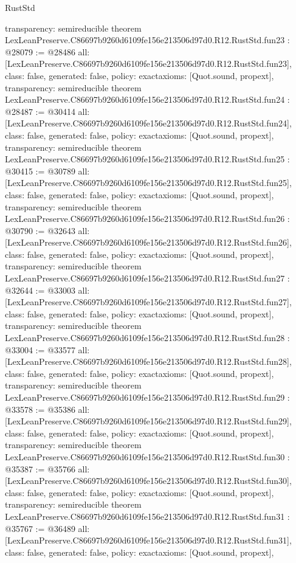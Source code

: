 \begin{lexlean}{RustStd}
\begin{coremodule}
{  transparency: semireducible
}
theorem LexLeanPreserve.C86697b9260d6109fe156e213506d97d0.R12.RustStd.fun23 : @28079 := @28486 {
  all: [LexLeanPreserve.C86697b9260d6109fe156e213506d97d0.R12.RustStd.fun23],
  class: false,
  generated: false,
  policy: exact{axioms: [Quot.sound, propext]},
  transparency: semireducible
}
theorem LexLeanPreserve.C86697b9260d6109fe156e213506d97d0.R12.RustStd.fun24 : @28487 := @30414 {
  all: [LexLeanPreserve.C86697b9260d6109fe156e213506d97d0.R12.RustStd.fun24],
  class: false,
  generated: false,
  policy: exact{axioms: [Quot.sound, propext]},
  transparency: semireducible
}
theorem LexLeanPreserve.C86697b9260d6109fe156e213506d97d0.R12.RustStd.fun25 : @30415 := @30789 {
  all: [LexLeanPreserve.C86697b9260d6109fe156e213506d97d0.R12.RustStd.fun25],
  class: false,
  generated: false,
  policy: exact{axioms: [Quot.sound, propext]},
  transparency: semireducible
}
theorem LexLeanPreserve.C86697b9260d6109fe156e213506d97d0.R12.RustStd.fun26 : @30790 := @32643 {
  all: [LexLeanPreserve.C86697b9260d6109fe156e213506d97d0.R12.RustStd.fun26],
  class: false,
  generated: false,
  policy: exact{axioms: [Quot.sound, propext]},
  transparency: semireducible
}
theorem LexLeanPreserve.C86697b9260d6109fe156e213506d97d0.R12.RustStd.fun27 : @32644 := @33003 {
  all: [LexLeanPreserve.C86697b9260d6109fe156e213506d97d0.R12.RustStd.fun27],
  class: false,
  generated: false,
  policy: exact{axioms: [Quot.sound, propext]},
  transparency: semireducible
}
theorem LexLeanPreserve.C86697b9260d6109fe156e213506d97d0.R12.RustStd.fun28 : @33004 := @33577 {
  all: [LexLeanPreserve.C86697b9260d6109fe156e213506d97d0.R12.RustStd.fun28],
  class: false,
  generated: false,
  policy: exact{axioms: [Quot.sound, propext]},
  transparency: semireducible
}
theorem LexLeanPreserve.C86697b9260d6109fe156e213506d97d0.R12.RustStd.fun29 : @33578 := @35386 {
  all: [LexLeanPreserve.C86697b9260d6109fe156e213506d97d0.R12.RustStd.fun29],
  class: false,
  generated: false,
  policy: exact{axioms: [Quot.sound, propext]},
  transparency: semireducible
}
theorem LexLeanPreserve.C86697b9260d6109fe156e213506d97d0.R12.RustStd.fun30 : @35387 := @35766 {
  all: [LexLeanPreserve.C86697b9260d6109fe156e213506d97d0.R12.RustStd.fun30],
  class: false,
  generated: false,
  policy: exact{axioms: [Quot.sound, propext]},
  transparency: semireducible
}
theorem LexLeanPreserve.C86697b9260d6109fe156e213506d97d0.R12.RustStd.fun31 : @35767 := @36489 {
  all: [LexLeanPreserve.C86697b9260d6109fe156e213506d97d0.R12.RustStd.fun31],
  class: false,
  generated: false,
  policy: exact{axioms: [Quot.sound, propext]},
}
\end{coremodule}
\end{lexlean}
